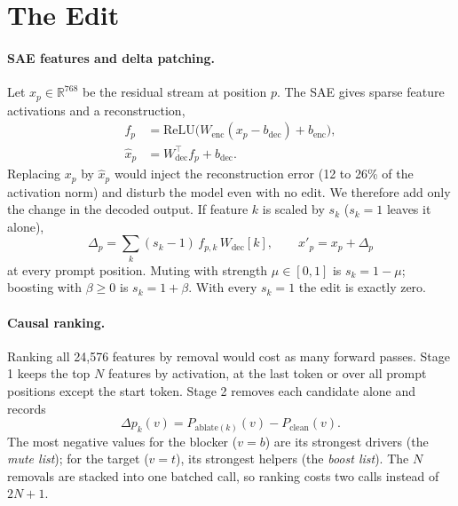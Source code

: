\documentclass[11pt,twocolumn]{article}
\newcommand{\Dp}{\Delta_p}
\newcommand{\Wdec}{W_{\mathrm{dec}}}
\begin{document}
\section{The Edit}
\label{sec:edit}

\paragraph{SAE features and delta patching.} Let $x_p\in\mathbb{R}^{768}$ be the residual stream at position $p$. The SAE gives sparse feature activations and a reconstruction,
\begin{equation}\label{eq:sae}
\begin{aligned}
f_p&=\mathrm{ReLU}\bigl(W_{\mathrm{enc}}(x_p-b_{\mathrm{dec}})+b_{\mathrm{enc}}\bigr),\\
\hat{x}_p&=\Wdec^{\top}f_p+b_{\mathrm{dec}}.
\end{aligned}
\end{equation}
Replacing $x_p$ by $\hat{x}_p$ would inject the reconstruction error (12 to 26\% of the activation norm) and disturb the model even with no edit. We therefore add only the change in the decoded output. If feature $k$ is scaled by $s_k$ ($s_k=1$ leaves it alone),
\begin{equation}\label{eq:delta}
\Dp=\sum_{k}(s_k-1)\,f_{p,k}\,\Wdec[k],\qquad x'_p=x_p+\Dp
\end{equation}
at every prompt position. Muting with strength $\mu\in[0,1]$ is $s_k=1-\mu$; boosting with $\beta\ge0$ is $s_k=1+\beta$. With every $s_k=1$ the edit is exactly zero.

\paragraph{Causal ranking.} Ranking all 24,576 features by removal would cost as many forward passes. Stage 1 keeps the top $N$ features by activation, at the last token or over all prompt positions except the start token. Stage 2 removes each candidate alone and records
\begin{equation}\label{eq:causal}
\Delta p_k(v)=P_{\mathrm{ablate}(k)}(v)-P_{\mathrm{clean}}(v).
\end{equation}
The most negative values for the blocker ($v=b$) are its strongest drivers (the \emph{mute list}); for the target ($v=t$), its strongest helpers (the \emph{boost list}). The $N$ removals are stacked into one batched call, so ranking costs two calls instead of $2N{+}1$.
\end{document}
